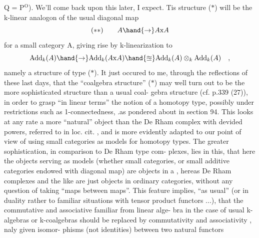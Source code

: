 
Q = P$^{\mathrm{O}}$). We'll come back upon this later, I expect.  Tis structure
($\ast$) will be the k-linear analogon of the usual diagonal map
\[ (\ast\ast) \qquad A \hand{\to} A\mathrm{x}A \]
for a small category A,  giving rise by k-linearization to
\[ \mathrm{Add}_k(A) \hand{\to} \mathrm{Add}_k(A\mathrm{x}A) \hand{\approxeq} \mathrm{Add}_k(A)\otimes_k\mathrm{Add}_k(A) \quad , \]
namely a structure of type ($\ast$).  It just occured to me,  through the
reflections of these last days,  that the ``coalgebra structure'' ($\ast$) may
well turn out  to be the more sophisticated structure than a usual coal-%
gebra structure (cf. p.339  (27)),  in order to grasp ``in linear terms''
the notion of a homotopy type,  possibly under restrictions such as
1-connectedness, .as pondered about in section 94.  This looks at any
rate a more ``natural'' object than the De Rham complex with devided
powers, referred to in loc. cit. ,  and is more evidently adapted to
our point of view of using small categories as models for homotopy
types.  The greater sophistication,  in comparison to De Rham type com-%
plexes, lies in this,  that here the objects serving as models (whether
small categories,  or small additive categories endowed with  diagonal
map) are objects in a \hand{\uline{\textcolor{black}{2-category}}},  hereas De Rham complexes and the 
like are just objects in ordinary categories,  without any question of
taking ``maps between maps''.  This feature implies, ``as usual'' (or in
duality rather to familiar situations with tensor product functors ...),
that the  commutative and associative \hand{\uline{\textcolor{black}{axioms}}}  familiar from linear alge-%
bra\hand{,} \hand{(}in the case of usual k-algebras or k-coalgebras\hand{)}\hand{,} should be
replaced by commutativity and associativity \hand{\uline{\textcolor{black}{data}}},  naly given isomor-%
phisms (not identities) between  two natural functors
